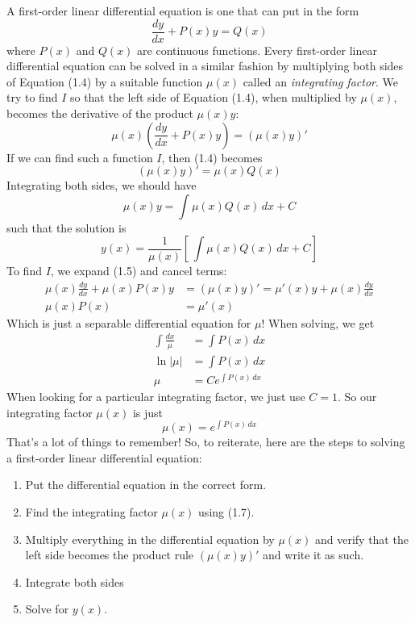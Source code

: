 \documentclass[10pt,reqno]{book}
\theoremstyle{definition}
\begin{document}
	A first-order linear differential equation is one that can put in the form
	\begin{equation}
		\frac{dy}{dx} + P(x)y = Q(x)
	\end{equation}
	where $ P(x) $ and $ Q(x) $ are continuous functions. Every first-order linear differential equation can be solved in a similar fashion by multiplying both  sides of Equation (1.4) by a suitable function $ \mu(x) $ called an \textit{integrating factor}. We try to find $ I $ so that the left side of Equation (1.4), when multiplied by $ \mu(x) $, becomes the derivative of the product $ \mu(x)y $:
	\begin{equation}
		\mu(x)\left(\frac{dy}{dx} +P(x)y\right) = (\mu(x)y)'
	\end{equation}
	If we can find such a function $ I $, then (1.4) becomes
	\[ (\mu(x)y)' = \mu(x)Q(x) \]
	Integrating both sides, we should have
	\[ \mu(x)y = \int \mu(x)Q(x)\,dx + C \]
	such that the solution is
	\begin{equation}
		y(x) = \frac{1}{\mu(x)}\left[\, \int \mu(x)Q(x)\,dx +C \right]
	\end{equation}
	To find $ I $, we expand (1.5) and cancel terms:
	\begin{align*}
		\mu(x)\frac{dy}{dx} + \mu(x)P(x)y &= (\mu(x)y)' = \mu'(x)y + \mu(x)\frac{dy}{dx}\\
		\mu(x)P(x) &= \mu'(x)
	\end{align*}
	Which is just a separable differential equation for $ \mu $! When solving, we get
	\begin{align*}
		\int \frac{dx}{\mu} &= \int P(x)\,dx\\
		\ln|\mu| &= \int P(x)\,dx\\
		\mu &= Ce^{\int P(x)\,dx}
	\end{align*}
	When looking for a particular integrating factor, we just use $ C = 1 $. So our integrating factor $ \mu(x) $ is just
	\begin{equation}
		\mu(x) = e^{\int P(x)\,dx}
	\end{equation}
	That's a lot of things to remember! So, to reiterate, here are the steps to solving a first-order linear differential equation:
	\begin{enumerate}
		\item Put the differential equation in the correct form.
		\item Find the integrating factor $ \mu(x) $ using (1.7).
		\item Multiply everything in the differential equation by $ \mu(x) $ and verify that the left side becomes the product rule $ (\mu(x)y)' $ and write it as such.
		\item Integrate both sides
		\item Solve for $ y(x) $.
	\end{enumerate}
\end{document}
